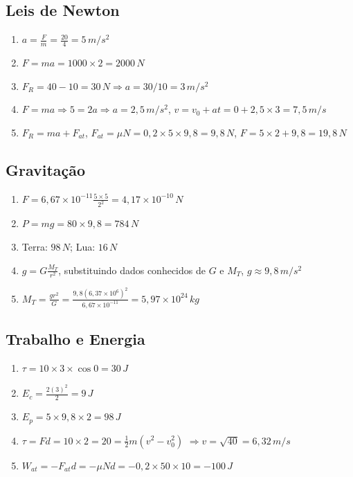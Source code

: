 \documentclass[12pt,a4paper]{article}
\begin{document}
\subsection{Leis de Newton}
\begin{enumerate}
\item $a = \frac{F}{m} = \frac{20}{4} = 5\,m/s^2$
\item $F = ma = 1000 \times 2 = 2000\,N$
\item $F_R = 40 - 10 = 30\,N \Rightarrow a = 30/10 = 3\,m/s^2$
\item $F = ma \Rightarrow 5 = 2a \Rightarrow a = 2{,}5\,m/s^2$, $v = v_0 + at = 0 + 2{,}5 \times 3 = 7{,}5\,m/s$
\item $F_R = ma + F_{at}$, $F_{at} = \mu N = 0{,}2 \times 5 \times 9{,}8 = 9{,}8\,N$, $F = 5 \times 2 + 9{,}8 = 19{,}8\,N$
\end{enumerate}

\subsection{Gravitação}
\begin{enumerate}
\item $F = 6{,}67\times10^{-11} \frac{5\times5}{2^2} = 4{,}17\times10^{-10}\,N$
\item $P = mg = 80 \times 9{,}8 = 784\,N$
\item Terra: $98\,N$; Lua: $16\,N$
\item $g = G\frac{M_T}{r^2}$, substituindo dados conhecidos de $G$ e $M_T$, $g \approx 9{,}8\,m/s^2$
\item $M_T = \frac{gr^2}{G} = \frac{9{,}8(6{,}37\times10^6)^2}{6{,}67\times10^{-11}} = 5{,}97\times10^{24}\,kg$
\end{enumerate}

\subsection{Trabalho e Energia}
\begin{enumerate}
\item $\tau = 10\times3\times\cos0 = 30\,J$
\item $E_c = \frac{2(3)^2}{2} = 9\,J$
\item $E_p = 5\times9{,}8\times2 = 98\,J$
\item $\tau = Fd = 10\times2 = 20 = \frac{1}{2}m(v^2 - v_0^2)$ $\Rightarrow v = \sqrt{40} = 6{,}32\,m/s$
\item $W_{at} = -F_{at}d = -\mu N d = -0{,}2\times50\times10 = -100\,J$
\end{enumerate}
\end{document}
